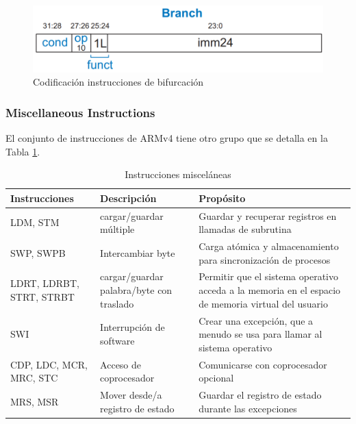 \documentclass[journal,trans]{IEEEtran}
\begin{document}
	\begin{figure}[h]
		\centering
		\includegraphics[width=\linewidth]{img/brpro.png}
		\caption{Codificación instrucciones de bifurcación \cite{SarahLHarris2010}}
		\label{fig:BranchP}
	\end{figure}

	\subsubsection{Miscellaneous Instructions}
	El conjunto de instrucciones de ARMv4 tiene otro grupo que se detalla en la Tabla \ref{tab:MISCP}.
	
	\begin{table}[h]
		\centering
		\begin{tabular}{|p{2cm}|p{3cm}|p{3cm}|}
			\hline
			Instrucciones            & Descripción                             & Propósito \\
			\hline
			\hline
			LDM, STM                 & cargar/guardar múltiple                 & Guardar y recuperar registros en llamadas de subrutina \\
			\hline
			SWP, SWPB                & Intercambiar byte                       & Carga atómica y almacenamiento para sincronización de procesos \\
			\hline
			LDRT, LDRBT, STRT, STRBT & cargar/guardar palabra/byte con traslado & Permitir que el sistema operativo acceda a la memoria en el espacio de memoria virtual del usuario \\
			\hline
			SWI                      & Interrupción de software                & Crear una excepción, que a menudo se usa para llamar al sistema operativo \\
			\hline
			CDP, LDC, MCR, MRC, STC  & Acceso de coprocesador                  & Comunicarse con coprocesador opcional \\
			\hline
			MRS, MSR                 & Mover desde/a registro de estado        & Guardar el registro de estado durante las excepciones \\
			\hline
		\end{tabular}
		\caption{Instrucciones misceláneas}
		\label{tab:MISCP}
	\end{table}
\end{document}
